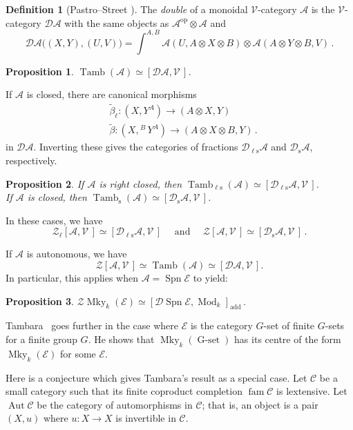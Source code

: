 \documentclass[a4paper,12pt]{article}
\newtheorem*{Proposition}{Proposition}
\theoremstyle{definition}
\newtheorem*{Definition}{Definition}%
\theoremstyle{fact}
\theoremstyle{genquest}
\theoremstyle{step}
\newcommand{\catA}{\mathcal{A}}
\newcommand{\Aut}{\operatorname{Aut}}
\newcommand{\catC}{\mathcal{C}}
\newcommand{\catD}{\mathcal{D}}
\newcommand{\catE}{\mathcal{E}}
\newcommand{\GSet}{\operatorname{G-set}}
\newcommand{\Mky}{\operatorname{Mky}}
\newcommand{\Mod}{\operatorname{Mod}}
\newcommand{\Spn}{\operatorname{Spn}}
\newcommand{\Tamb}{\operatorname{Tamb}}
\newcommand{\TambLS}{\Tamb_{\ell\mathrm{s}}}
\newcommand{\TambS}{\Tamb_{\mathrm{s}}}
\newcommand{\catV}{\mathcal{V}}
\newcommand{\catZ}{\mathcal{Z}}%
\newcommand{\add}{\operatorname{add}}
\newcommand{\elless}{\ell\mathrm{s}}
\newcommand{\ess}{\mathrm{s}}
\newcommand{\ffam}{\operatorname{fam}}
\newcommand{\op}{\operatorname{op}}
\newcommand{\longto}{\longrightarrow}
\begin{document}
\begin{Definition}[Pastro--Street \cite{PastroSt2008}]
The \emph{double} of a monoidal $\catV$-category $\catA$ is the $\catV$-category $\catD\catA$ 
with the same objects as $\catA^{\op} \otimes \catA$ and
\[
\catD\catA \bigl((X,Y),(U,V)\bigr) = \int^{A,B} \catA (U,A \otimes X \otimes B) \otimes \catA (A\otimes Y \otimes B,V)\,.
\]
\end{Definition}


\begin{Proposition}
$\Tamb(\catA) \simeq [\catD\catA,\catV\,]$.
\end{Proposition}

If $\catA$ is closed, there are canonical morphisms
\begin{align*}
&\tilde \beta_\ell : (X,Y^A) \longto (A \otimes X,Y) \\
&\tilde \beta : (X,^{\; B}\!Y^A) \longto  (A \otimes X \otimes B,Y)\,.
\end{align*}
in $\catD\catA$.   Inverting these gives the categories of fractions $\catD_{\elless}\catA$ and $\catD_{\ess}\catA$, respectively.

\begin{Proposition}
If $\catA$ is right closed, then
$\TambLS (\catA) \simeq [\catD_{\elless} \catA,\catV\,]$.
\\
If $\catA$ is closed, then
$ \TambS (\catA) \simeq [\catD_{\ess} \catA,\catV\,]$.
\end{Proposition}
%
\noindent
In these cases, we have
\[
\catZ_\ell [\catA,\catV\,] \simeq [\catD_{\elless} \catA,\catV\,] 
\quad \text{ and } \quad
\catZ [\catA,\catV\,] \simeq [\catD_{\ess} \catA,\catV\,]\,.
\]

If $\catA$ is autonomous, we have
\[
\catZ [\catA,\catV\,] \simeq \Tamb  (\catA) \simeq [\catD\catA,\catV\,].
\]
In particular, this applies when $\catA = \Spn \catE$ to yield:
%
\begin{Proposition}
$\catZ \Mky _k (\catE) \simeq [\catD \Spn \catE, \Mod_k]_{\add}\,$.
\end{Proposition}

\noindent
Tambara~\cite{Tambara2008} goes further in the case where $\catE$ is the category $G$-set 
of finite $G$-sets for a finite group $G$. 
He shows that $\Mky_k (\GSet)$ has its centre of the form $\Mky_k (\catE)$ for some $\catE$.

Here is a conjecture which gives Tambara's result as a special case. 
Let $\catC$ be a small category such that its finite coproduct completion $\ffam \catC$ is lextensive.  
Let $\Aut \catC$ be the category of automorphisms in $\catC$; 
that is, an object is a pair $(X,u)$ where $u : X \to X$ is invertible in $\catC$.
\end{document}

